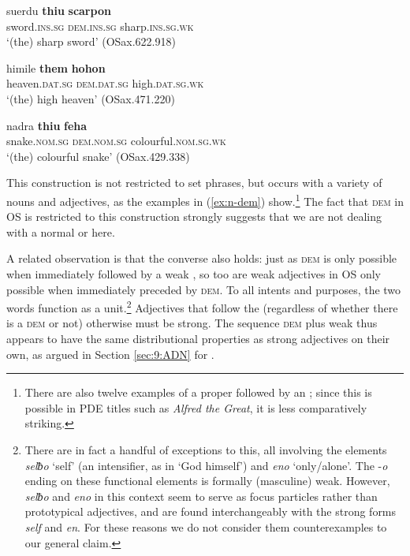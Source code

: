 \documentclass[output=paper,colorlinks,citecolor=brown]{langscibook}
\begin{document}
\begin{exe}     
 \ex\label{ex:n-dem}
 \begin{xlist}
     \ex\gll suerdu \textbf{thiu} \textbf{scarpon}\\
     sword.\textsc{ins.sg} \textsc{dem.ins.sg} sharp.\textsc{ins.sg.wk}\\
     \glt `(the) sharp sword' (OSax.622.918)
     
     \ex\gll himile \textbf{them} \textbf{hohon}\\
     heaven.\textsc{dat.sg} \textsc{dem.dat.sg} high.\textsc{dat.sg.wk}\\
     \glt `(the) high heaven' (OSax.471.220)

     \ex\gll nadra \textbf{thiu} \textbf{feha}\\
     snake.\textsc{nom.sg} \textsc{dem.nom.sg} colourful.\textsc{nom.sg.wk}\\
     \glt `(the) colourful snake' (OSax.429.338)
 \end{xlist}
\end{exe}     

This construction is not restricted to set phrases, but occurs with a variety of nouns and adjectives, as the examples in (\ref{ex:n-dem}) show.\footnote{There are also twelve examples of a proper  followed by an ; since this is possible in PDE titles such as \emph{Alfred the Great}, it is less comparatively striking.} The fact that  \textsc{dem} in OS is restricted to this construction strongly suggests that we are not dealing with a normal  or  here.

A related observation is that the converse also holds: just as  \textsc{dem} is only possible when immediately followed by a weak , so too are  weak adjectives in OS only possible when immediately preceded by \textsc{dem}. To all intents and purposes, the two words function as a unit.\footnote{There are in fact a handful of exceptions to this, all involving the elements \textit{selƀo} `self' (an intensifier, as in `God himself') and \textit{eno} `only/alone'. The -\emph{o} ending on these functional elements is formally (masculine) weak. However, \textit{selƀo} and \textit{eno} in this context seem to serve as focus particles rather than prototypical adjectives, and are found interchangeably with the strong forms \emph{self} and \emph{en}. For these reasons we do not consider them counterexamples to our general claim.} Adjectives that follow the  (regardless of whether there is a  \textsc{dem} or not) otherwise must be strong. The sequence \textsc{dem} plus weak  thus appears to have the same distributional properties as strong adjectives on their own, as argued in Section \ref{sec:9:ADN} for .
\end{document}
